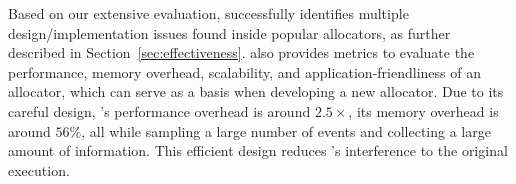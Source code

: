 

Based on our extensive evaluation, \MP{} successfully identifies multiple design/implementation issues found inside popular allocators, as further described in Section~\ref{sec:effectiveness}. \MP{} also provides metrics to evaluate the performance, memory overhead, scalability, and application-friendliness of an allocator, which can serve as a basis when developing a new allocator. Due to its careful design, \MP{}'s performance overhead is around $2.5\times$, its memory overhead is around $56\%$, all while sampling a large number of events and collecting a large amount of information. This efficient design reduces \MP{}'s interference to the original execution. 

